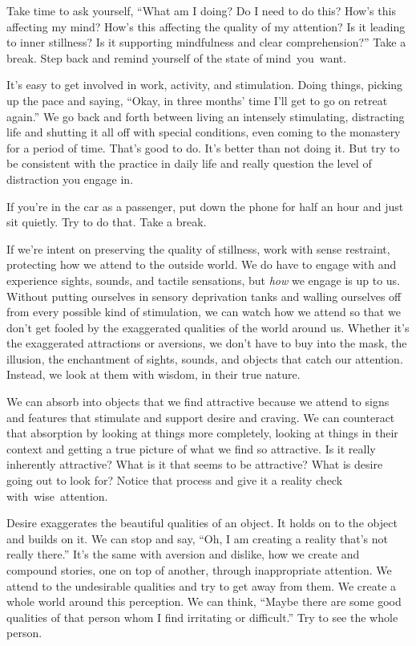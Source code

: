 Take time to ask yourself, ``What am I doing? Do I need to do this? How's this affecting my mind? How's this affecting the quality of my attention? Is it leading to inner stillness? Is it supporting mindfulness and clear comprehension?'' Take a break. Step back and remind yourself of the state of \mbox{mind you want.}

It's easy to get involved in work, activity, and stimulation. Doing things, picking up the pace and saying, ``Okay, in three months' time I'll get to go on retreat again.'' We go back and forth between living an intensely stimulating, distracting life and shutting it all off with special conditions, even coming to the monastery for a period of time. That's good to do. It's better than not doing it. But try to be consistent with the practice in daily life and really question the level of distraction you engage in.

If you're in the car as a passenger, put down the phone for half an hour and just sit quietly. Try to do that. Take a break.

If we're intent on preserving the quality of stillness, work with sense restraint, protecting how we attend to the outside world. We do have to engage with and experience sights, sounds, and tactile sensations, but \emph{how} we engage is up to us. Without putting ourselves in sensory deprivation tanks and walling ourselves off from every possible kind of stimulation, we can watch how we attend so that we don't get fooled by the exaggerated qualities of the world around us. Whether it's the exaggerated attractions or aversions, we don't have to buy into the mask, the illusion, the enchantment of sights, sounds, and objects that catch our attention. Instead, we look at them with wisdom, in their true nature.

We can absorb into objects that we find attractive because we attend to signs and features that stimulate and support desire and craving. We can counteract that absorption by looking at things more completely, looking at things in their context and getting a true picture of what we find so attractive. Is it really inherently attractive? What is it that seems to be attractive? What is desire going out to look for? Notice that process and give it a reality check \mbox{with wise attention.}

Desire exaggerates the beautiful qualities of an object. It holds on to the object and builds on it. We can stop and say, ``Oh, I am creating a reality that's not really there.'' It's the same with aversion and dislike, how we create and \mbox{compound} stories, one on top of another, through inappropriate attention. We attend to the undesirable qualities and try to get away from them. We create a whole world around this perception. We can think, ``Maybe there are some good qualities of that person whom I find irritating or difficult.'' Try to see the whole person.

